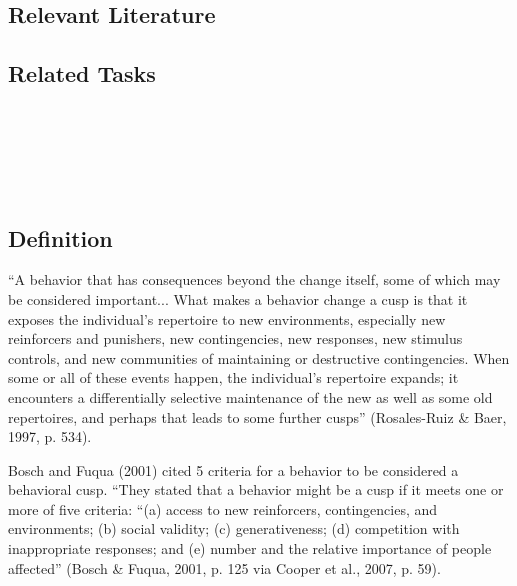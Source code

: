 \subsection{Relevant Literature}
\begin{refsection}
\nocite{test,alang2017police,clayton2018black}
\printbibliography[heading=none]
\end{refsection}
%
\subsection{Related Tasks}
\fourjSix{}\\
\fourjSeven{}\\
\fourjEight{}\\
\fourjEleven{}\\
%
%
%
%
%
%
%
%
%
%
\section[\fourjThirteen{}]{\fourjThirteen{}%
              }
\subsection{Definition}
``A behavior that has consequences beyond the change itself, some of which may be considered important... What makes a behavior change a cusp is that it exposes the individual's repertoire to new environments, especially new reinforcers and punishers, new contingencies, new responses, new stimulus controls, and new communities of maintaining or destructive contingencies. When some or all of these events happen, the individual's repertoire expands; it encounters a differentially selective maintenance of the new as well as some old repertoires, and perhaps that leads to some further cusps'' (Rosales-Ruiz \& Baer, 1997, p. 534).

Bosch and Fuqua (2001) cited 5 criteria for a behavior to be considered a behavioral cusp. ``They stated that a behavior might be a cusp if it meets one or more of five criteria: ``(a) access to new reinforcers, contingencies, and environments; (b) social validity; (c) generativeness; (d) competition with inappropriate responses; and (e) number and the relative importance of people affected'' (Bosch \& Fuqua, 2001, p. 125 via Cooper et al., 2007, p. 59).
%
